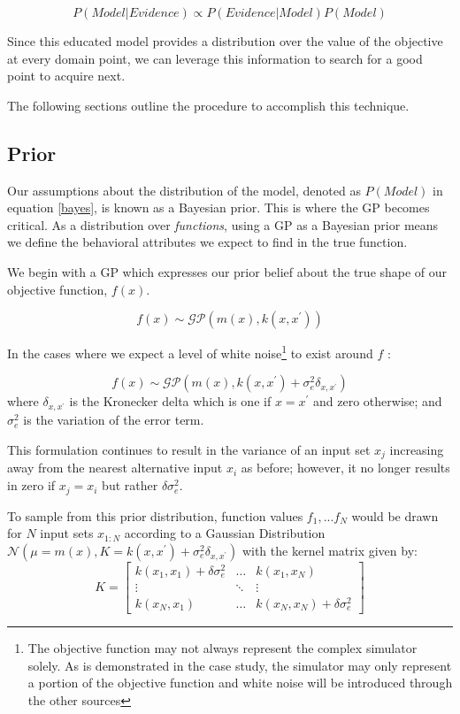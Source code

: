 \begin{equation}\label{bayes}
P(Model| Evidence) \propto P(Evidence|Model)P(Model)
\end{equation}

Since this educated model provides a distribution over the value of the objective at every domain point, we can leverage this information to search for a good point to acquire next.

The following sections outline the procedure to accomplish this technique.

\subsection{Prior}

Our assumptions about the distribution of the model, denoted as $P(Model)$ in equation \ref{bayes}, is known as a Bayesian prior. This is where the GP becomes critical. As a distribution over \textit{functions}, using a GP as a Bayesian prior means we define the behavioral attributes we expect to find in the true function.

We begin with a GP which expresses our prior belief about the true shape of our objective function, $f(x)$.

\begin{equation}
f(x) \sim \mathcal{GP}(m(x),k(x,x^\prime))
\end{equation}

In the cases where we expect a level of white noise\footnote{The objective function may not always represent the complex simulator solely. As is demonstrated in the case study, the simulator may only represent a portion of the objective function and white noise will be introduced through the other sources} to exist around $f$  \cite{gramacy_cases_2012}:

\begin{equation}
f(x) \sim \mathcal{GP}( m(x),k(x,{x}^{\prime}) + \sigma_e^2\delta_{x,x^{\prime}})
\end{equation}
where $\delta_{x,x^{\prime}}$ is the Kronecker delta which is one if $x = x^{\prime}$ and zero otherwise; and $\sigma_e^2$ is the variation of the error term.

This formulation continues to result in the variance of an input set $x_j$ increasing away from the nearest alternative input $x_i$ as before; however, it no longer results in zero if $x_j = x_i$ but rather $\delta\sigma_e^2$.

To sample from this prior distribution, function values $f_1,...f_N$ would be drawn for $N$ input sets ${x_{1:N}}$ according to a Gaussian Distribution $\mathcal{N}(\mu = m(x), K= k(x,x^\prime)+\sigma_e^2\delta_{x,x^{\prime}})$ with the kernel matrix given by:
\begin{equation}
K = \left[\begin{array}{ccc}k(x_1,x_1)+\delta\sigma_e^2 & \dots & k(x_1,x_N)\\ \vdots & \ddots & \vdots \\k(x_N,x_1) & \dots & k(x_N,x_N)+\delta\sigma_e^2\end{array}\right]
\end{equation}

